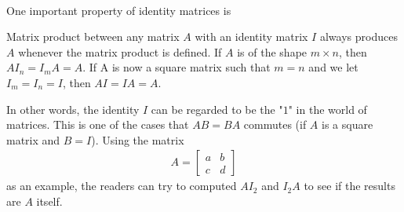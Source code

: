 \\
One important property of identity matrices is
\begin{proper}
\label{proper:identity}
Matrix product between any matrix $A$ with an identity matrix $I$ always produces $A$ whenever the matrix product is defined. If $A$ is of the shape $m \times n$, then $AI_n = I_mA = A$. If A is now a square matrix such that $m=n$ and we let $I_m = I_n = I$, then $AI = IA = A$.
\end{proper}
In other words, the identity $I$ can be regarded to be the "$1$" in the world of matrices. This is one of the cases that $AB = BA$ commutes (if $A$ is a square matrix and $B=I$).
Using the matrix
\begin{align*}
A =
\begin{bmatrix}
a & b \\
c & d
\end{bmatrix}
\end{align*}
as an example, the readers can try to computed $AI_2$ and $I_2A$ to see if the results are $A$ itself.

